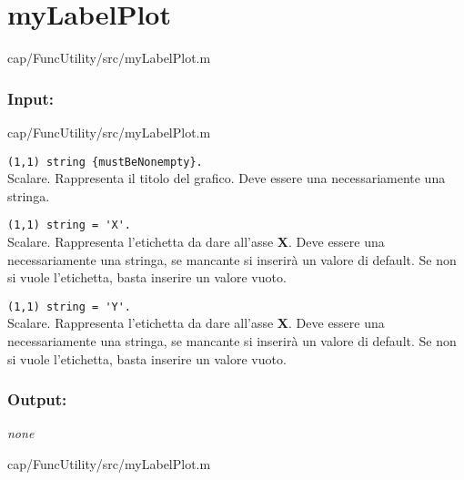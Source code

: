 \section{myLabelPlot}\label{fnc:myLabelPlot}


{cap/FuncUtility/src/myLabelPlot.m}%

\subsubsection{Input:}

{cap/FuncUtility/src/myLabelPlot.m}%

\begin{tcolorbox}
    
    \begin{description} 
\setlength{\itemindent}{-.2in}%
    \item[\textit{titlePlot:}] \verb|(1,1) string {mustBeNonempty}.|\\
    Scalare. Rappresenta il titolo del grafico. Deve essere una necessariamente 
    una stringa.
    
    \item[\textit{xAxe:}] \verb|(1,1) string = 'X'.|\\
    Scalare. Rappresenta l'etichetta da dare all'asse \textbf{X}. Deve essere 
    una necessariamente una stringa, se mancante si inserirà un valore di 
    default. Se non si vuole l'etichetta, basta inserire un valore vuoto.
    
    \item[\textit{xAxe:}] \verb|(1,1) string = 'Y'.|\\
    Scalare. Rappresenta l'etichetta da dare all'asse \textbf{X}. Deve essere 
    una necessariamente una stringa, se mancante si inserirà un valore di 
    default. Se non si vuole l'etichetta, basta inserire un valore vuoto.
\end{description}
\end{tcolorbox}

\subsubsection{Output:}
\textit{none}


{cap/FuncUtility/src/myLabelPlot.m}%

